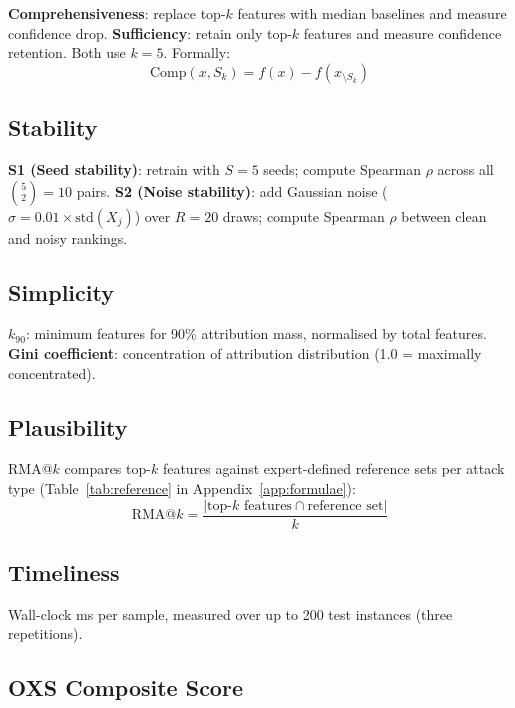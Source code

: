 \documentclass[12pt,a4paper]{report}
\begin{document}
\textbf{Comprehensiveness}: replace top-$k$ features with median baselines and measure confidence drop. \textbf{Sufficiency}: retain only top-$k$ features and measure confidence retention. Both use $k = 5$. Formally:
\begin{equation}
\text{Comp}(x, S_k) = f(x) - f(x_{\setminus S_k})
\end{equation}

\subsection{Stability}
\label{sec:stability}

\textbf{S1 (Seed stability)}: retrain with $S = 5$ seeds; compute Spearman $\rho$ across all $\binom{5}{2} = 10$ pairs. \textbf{S2 (Noise stability)}: add Gaussian noise ($\sigma = 0.01 \times \text{std}(X_j)$) over $R = 20$ draws; compute Spearman $\rho$ between clean and noisy rankings.

\subsection{Simplicity}
\label{sec:simplicity}

\textbf{$k_{90}$}: minimum features for 90\% attribution mass, normalised by total features. \textbf{Gini coefficient}: concentration of attribution distribution (1.0 = maximally concentrated).

\subsection{Plausibility}
\label{sec:plausibility}

RMA@$k$ compares top-$k$ features against expert-defined reference sets per attack type (Table~\ref{tab:reference} in Appendix~\ref{app:formulae}):
\begin{equation}
\text{RMA@}k = \frac{|\text{top-}k \text{ features} \cap \text{reference set}|}{k}
\end{equation}

\subsection{Timeliness}
\label{sec:timeliness}

Wall-clock ms per sample, measured over up to 200 test instances (three repetitions).

\subsection{OXS Composite Score}
\label{sec:oxs}
\end{document}
